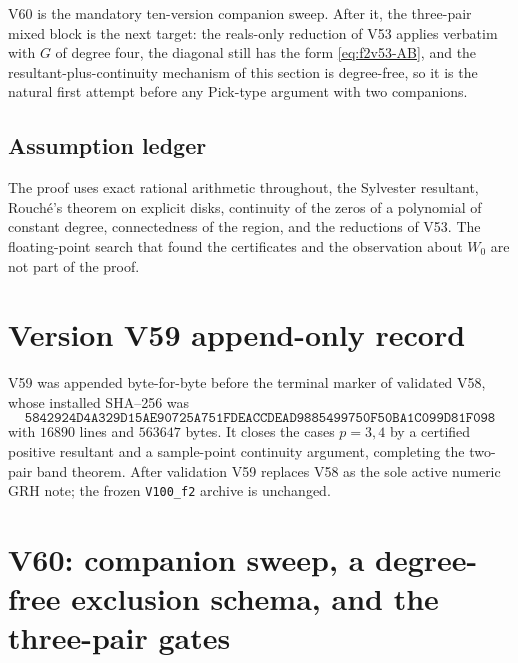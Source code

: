 \documentclass[11pt]{article}
\theoremstyle{definition}
\theoremstyle{remark}
\begin{document}
V60 is the mandatory ten-version companion sweep.  After it, the
three-pair mixed block is the next target: the reals-only reduction of
V53 applies verbatim with \(G\) of degree four, the diagonal still has
the form \eqref{eq:f2v53-AB}, and the resultant-plus-continuity mechanism
of this section is degree-free, so it is the natural first attempt
before any Pick-type argument with two companions.

\subsection*{Assumption ledger}
\label{ass:f2v59}
The proof uses exact rational arithmetic throughout, the Sylvester
resultant, Rouch\'{e}'s theorem on explicit disks, continuity of the
zeros of a polynomial of constant degree, connectedness of the region,
and the reductions of V53.  The floating-point search that found the
certificates and the observation about \(W_0\) are not part of the
proof.
\endgroup

\section*{Version V59 append-only record}

V59 was appended byte-for-byte before the terminal marker of validated
V58, whose installed SHA--256 was
\[
 \texttt{5842924D4A329D15AE90725A751FDEAC}
 \allowbreak\texttt{CDEAD9885499750F50BA1C099D81F098}
\]
with \(16890\) lines and \(563647\) bytes.  It closes the cases
\(p=3,4\) by a certified positive resultant and a sample-point
continuity argument, completing the two-pair band theorem.  After
validation V59 replaces V58 as the sole active numeric GRH note; the
frozen \texttt{V100\_f2} archive is unchanged.





\clearpage
\section{V60: companion sweep, a degree-free exclusion schema, and the three-pair gates}
\label{sec:f2v60-sweep-schema}
\begingroup
\setcounter{equation}{0}
\renewcommand{\theequation}{N60.\arabic{equation}}
\renewcommand{\theHequation}{f2v60.\arabic{equation}}
\end{document}

